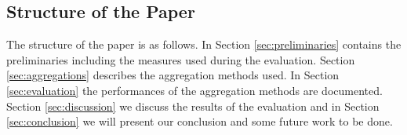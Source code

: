 \subsection{Structure of the Paper}
The structure of the paper is as follows. In Section \ref{sec:preliminaries} contains the preliminaries including the measures used during the evaluation. Section \ref{sec:aggregations} describes the aggregation methods used. In Section \ref{sec:evaluation} the performances of the aggregation methods are documented. Section \ref{sec:discussion} we discuss the results of the evaluation and in Section \ref{sec:conclusion} we will present our conclusion and some future work to be done.